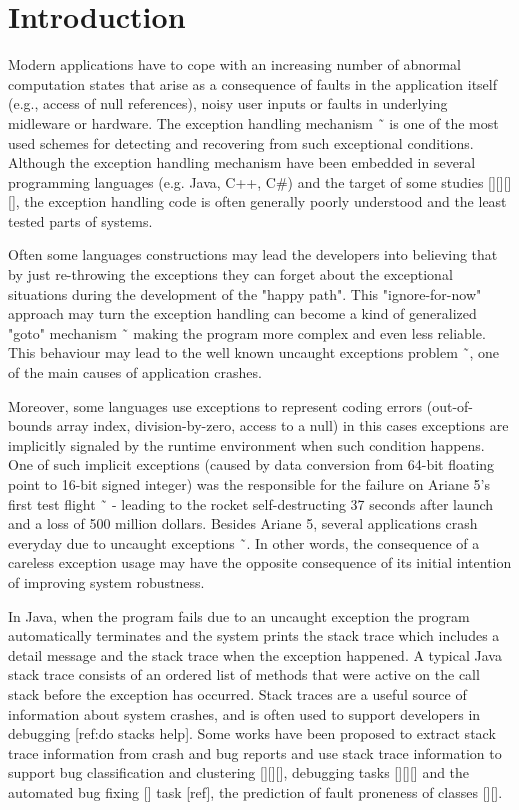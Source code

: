 \documentclass[conference]{IEEEtran}
\begin{document}
\section{Introduction}

Modern applications have to cope with an increasing number of abnormal computation states that arise as a consequence of faults in the application itself (e.g., access of null references), noisy user inputs or faults in underlying midleware or hardware. The exception handling mechanism ˜\cite{goodenough1975exception} is one of the most used schemes for detecting and recovering from such exceptional conditions. Although the exception handling mechanism have been embedded in several programming languages (e.g. Java, C++, C\#) and the target of some studies [][][][], the exception handling code is often generally poorly understood and the least tested parts of systems. 

Often some languages constructions may lead the developers into believing that by just re-throwing the exceptions they can forget about the exceptional situations during the development of the "happy path". This "ignore-for-now" approach may turn the exception handling can become a kind of generalized "goto" mechanism ˜\cite{mandrioli1992advances} making the program more complex and even less reliable. This behaviour may lead to the well known uncaught exceptions problem ˜\cite{jo2004uncaught}, one of the main causes of application crashes.  

Moreover, some languages use exceptions to represent coding errors (out-of-bounds array index, division-by-zero, access to a null) in this cases exceptions are implicitly signaled by the runtime environment when such condition happens. One of such implicit exceptions (caused by data conversion from 64-bit floating point to 16-bit signed integer) was the responsible for the failure on Ariane 5's first test flight ˜\cite{lions1996ariane} - leading to the rocket self-destructing 37 seconds after launch and a loss of 500 million dollars. Besides Ariane 5, several applications crash everyday due to uncaught exceptions ˜\cite{jo2004uncaught}. In other words, the consequence of a careless exception usage may have the opposite consequence of its initial intention of improving system robustness.

In Java, when the program fails due to an uncaught exception the program automatically terminates and the system prints the stack trace which includes a detail message and the stack trace when the exception happened. A typical Java stack trace consists of an ordered list of methods that were active on the call stack before the exception has occurred. Stack traces are a useful source of information about system crashes, and is often used to support developers in debugging [ref:do stacks help]. Some works have been proposed to extract stack trace information from crash and bug reports and use stack trace information to support bug classification and clustering [][][], debugging tasks [][][] and the automated bug fixing [] task [ref], the prediction of fault proneness of classes [][]. 
\end{document}
